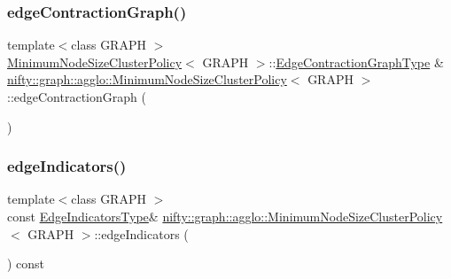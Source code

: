 \mbox{\label{classnifty_1_1graph_1_1agglo_1_1MinimumNodeSizeClusterPolicy_aca43c3bece87aa733c25cef542006a42}} 
\subsubsection{\texorpdfstring{edge\+Contraction\+Graph()}{edgeContractionGraph()}}
{\footnotesize\ttfamily template$<$class G\+R\+A\+PH $>$ \\
\hyperlink{classnifty_1_1graph_1_1agglo_1_1MinimumNodeSizeClusterPolicy}{Minimum\+Node\+Size\+Cluster\+Policy}$<$ G\+R\+A\+PH $>$\+::\hyperlink{classnifty_1_1graph_1_1agglo_1_1MinimumNodeSizeClusterPolicy_a5c67401c61d1d283b73c3ce8a31faeb9}{Edge\+Contraction\+Graph\+Type} \& \hyperlink{classnifty_1_1graph_1_1agglo_1_1MinimumNodeSizeClusterPolicy}{nifty\+::graph\+::agglo\+::\+Minimum\+Node\+Size\+Cluster\+Policy}$<$ G\+R\+A\+PH $>$\+::edge\+Contraction\+Graph (\begin{DoxyParamCaption}{ }\end{DoxyParamCaption})\hspace{0.3cm}{\ttfamily [inline]}}

\mbox{\label{classnifty_1_1graph_1_1agglo_1_1MinimumNodeSizeClusterPolicy_a1a03ddb9ab64483e30d5724fc9d79f26}} 
\subsubsection{\texorpdfstring{edge\+Indicators()}{edgeIndicators()}}
{\footnotesize\ttfamily template$<$class G\+R\+A\+PH $>$ \\
const \hyperlink{classnifty_1_1graph_1_1agglo_1_1MinimumNodeSizeClusterPolicy_a81a0b54e4eadb98c9a125593b1c6e17c}{Edge\+Indicators\+Type}\& \hyperlink{classnifty_1_1graph_1_1agglo_1_1MinimumNodeSizeClusterPolicy}{nifty\+::graph\+::agglo\+::\+Minimum\+Node\+Size\+Cluster\+Policy}$<$ G\+R\+A\+PH $>$\+::edge\+Indicators (\begin{DoxyParamCaption}{ }\end{DoxyParamCaption}) const\hspace{0.3cm}{\ttfamily [inline]}}

